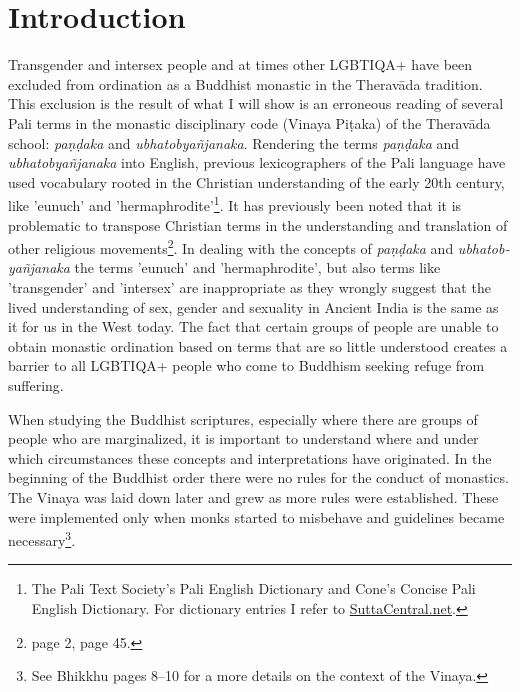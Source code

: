 \section{Introduction}
Transgender and intersex people and at times other LGBTIQA+ have been excluded from ordination as a Buddhist monastic in the Theravāda tradition. This exclusion is the result of what I will show is an erroneous reading of several Pali terms in the monastic disciplinary code (Vinaya Piṭaka) of the Theravāda school: {\em paṇḍaka} and {\em ubhatob­yañ­janaka}. Rendering the terms {\em paṇḍaka} and {\em ubhatob­yañ­janaka} into English, previous lexicographers of the Pali language have used vocabulary rooted in the Christian understanding of the early 20th century, like 'eunuch' and 'hermaphrodite'\footnote{The Pali Text Society's Pali English Dictionary and Cone's Concise Pali English Dictionary. For dictionary entries I refer to \href{https://suttacentral.net/}{SuttaCentral.net}.}. It has previously been noted that it is problematic to transpose Christian terms in the understanding and translation of other religious movements\footnote{\cite{maes} page 2, \cite{dudas} page 45.}. In dealing with the concepts of {\em paṇḍaka} and {\em ubhatob­yañ­janaka} the terms 'eunuch' and 'hermaphrodite', but also terms like 'transgender' and 'intersex' are inappropriate as they wrongly suggest that the lived understanding of sex, gender and sexuality in Ancient India is the same as it for us in the West today. The fact that certain groups of people are unable to obtain monastic ordination based on terms that are so little understood creates a barrier to all LGBTIQA+ people who come to Buddhism seeking refuge from suffering.

When studying the Buddhist scriptures, especially where there are groups of people who are marginalized, it is important to understand where and under which circumstances these concepts and interpretations have originated. In the beginning of the Buddhist order there were no rules for the conduct of monastics. The Vinaya was laid down later and grew as more rules were established. These were implemented only when monks started to misbehave and guidelines became necessary\footnote{See Bhikkhu \cite{sujato2009} pages 8–10 for a more details on the context of the Vinaya.}. 

